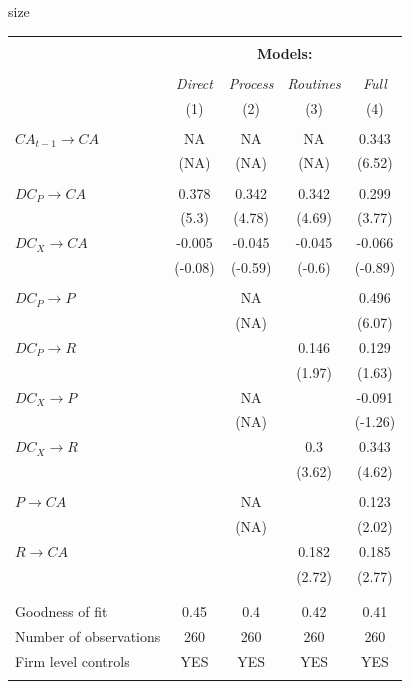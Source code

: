 \documentclass[review,fleqn]{elsarticle}\usepackage[]{graphicx}\usepackage[]{color}
\begin{document}
\begin{table}
\begin{center}
\script size
\begin{tabular}{lcccc}

\hline \\[-2pt]
 & \multicolumn{4}{c}{{\bf Models:}} \\  \cline{2-5} \\[-3pt] 
 & \emph{Direct} & \emph{Process} & \emph{Routines} & \emph{Full}\\
 & (1) & (2) & (3) & (4)\\
\hline
 &  &  &  & \\
\(CA_{t-1} \rightarrow CA\) & NA & NA & NA & 0.343\\
 & (NA) & (NA) & (NA) & (6.52)\\[3pt]
 &  &  &  & \\
\(DC_P \rightarrow CA\) & 0.378 & 0.342 & 0.342 & 0.299\\
 & (5.3) & (4.78) & (4.69) & (3.77)\\[4pt]
\(DC_X \rightarrow CA\) & -0.005 & -0.045 & -0.045 & -0.066\\
 & (-0.08) & (-0.59) & (-0.6) & (-0.89)\\[4pt]
 &  &  &  & \\
\(DC_P \rightarrow P\) &  & NA &  & 0.496\\
 &  & (NA) &  & (6.07)\\[4pt]
\(DC_P \rightarrow R\) &  &  & 0.146 & 0.129\\
 &  &  & (1.97) & (1.63)\\[4pt]
\(DC_X \rightarrow P\) &  & NA &  & -0.091\\
 &  & (NA) &  & (-1.26)\\[4pt]
\(DC_X \rightarrow R\) &  &  & 0.3 & 0.343\\
 &  &  & (3.62) & (4.62)\\[4pt]
 &  &  &  & \\
\(P \rightarrow CA\) &  & NA &  & 0.123\\
 &  & (NA) &  & (2.02)\\[4pt]
\(R \rightarrow CA\) &  &  & 0.182 & 0.185\\
 &  &  & (2.72) & (2.77)\\[4pt]
 &  &  &  & \\
\hline \\[-3pt] 
Goodness of fit & 0.45 & 0.4 & 0.42 & 0.41\\
Number of observations & 260 & 260 & 260 & 260\\
  Firm level controls & YES & YES & YES & YES\\[3pt]
\hline
 &  &  &  & \\
\end{tabular}
\end{center}
 \label{tab:reg}
\end{table}
\end{document}
